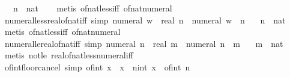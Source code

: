 \begin{isabellebody}
\ \ \ n\ {\isacharcolon}{\kern0pt}{\isacharcolon}{\kern0pt}\ nat\isanewline
%
\isadelimproof
\ \ %
\endisadelimproof
%
\isatagproof
{}\isamarkupfalse%
\ {\isacharparenleft}{\kern0pt}metis\ of{\isacharunderscore}{\kern0pt}nat{\isacharunderscore}{\kern0pt}less{\isacharunderscore}{\kern0pt}iff\ of{\isacharunderscore}{\kern0pt}nat{\isacharunderscore}{\kern0pt}numeral{\isacharparenright}{\kern0pt}%
\endisatagproof
{\isafoldproof}%
%
\isadelimproof
\isanewline
%
\endisadelimproof
\isanewline
{}\isamarkupfalse%
\ numeral{\isacharunderscore}{\kern0pt}less{\isacharunderscore}{\kern0pt}real{\isacharunderscore}{\kern0pt}of{\isacharunderscore}{\kern0pt}nat{\isacharunderscore}{\kern0pt}iff\ {\isacharbrackleft}{\kern0pt}simp{\isacharbrackright}{\kern0pt}{\isacharcolon}{\kern0pt}\ {\isachardoublequoteopen}numeral\ w\ {\isacharless}{\kern0pt}\ real\ n\ {\isasymlongleftrightarrow}\ numeral\ w\ {\isacharless}{\kern0pt}\ n{\isachardoublequoteclose}\isanewline
\ \ \ n\ {\isacharcolon}{\kern0pt}{\isacharcolon}{\kern0pt}\ nat\isanewline
%
\isadelimproof
\ \ %
\endisadelimproof
%
\isatagproof
{}\isamarkupfalse%
\ {\isacharparenleft}{\kern0pt}metis\ of{\isacharunderscore}{\kern0pt}nat{\isacharunderscore}{\kern0pt}less{\isacharunderscore}{\kern0pt}iff\ of{\isacharunderscore}{\kern0pt}nat{\isacharunderscore}{\kern0pt}numeral{\isacharparenright}{\kern0pt}%
\endisatagproof
{\isafoldproof}%
%
\isadelimproof
\isanewline
%
\endisadelimproof
\isanewline
{}\isamarkupfalse%
\ numeral{\isacharunderscore}{\kern0pt}le{\isacharunderscore}{\kern0pt}real{\isacharunderscore}{\kern0pt}of{\isacharunderscore}{\kern0pt}nat{\isacharunderscore}{\kern0pt}iff\ {\isacharbrackleft}{\kern0pt}simp{\isacharbrackright}{\kern0pt}{\isacharcolon}{\kern0pt}\ {\isachardoublequoteopen}numeral\ n\ {\isasymle}\ real\ m\ {\isasymlongleftrightarrow}\ numeral\ n\ {\isasymle}\ m{\isachardoublequoteclose}\isanewline
\ \ \ m\ {\isacharcolon}{\kern0pt}{\isacharcolon}{\kern0pt}\ nat\isanewline
%
\isadelimproof
\ \ %
\endisadelimproof
%
\isatagproof
{}\isamarkupfalse%
\ {\isacharparenleft}{\kern0pt}metis\ not{\isacharunderscore}{\kern0pt}le\ real{\isacharunderscore}{\kern0pt}of{\isacharunderscore}{\kern0pt}nat{\isacharunderscore}{\kern0pt}less{\isacharunderscore}{\kern0pt}numeral{\isacharunderscore}{\kern0pt}iff{\isacharparenright}{\kern0pt}%
\endisatagproof
{\isafoldproof}%
%
\isadelimproof
\isanewline
%
\endisadelimproof
\isanewline
{}\isamarkupfalse%
\ of{\isacharunderscore}{\kern0pt}int{\isacharunderscore}{\kern0pt}floor{\isacharunderscore}{\kern0pt}cancel\ {\isacharbrackleft}{\kern0pt}simp{\isacharbrackright}{\kern0pt}{\isacharcolon}{\kern0pt}\ {\isachardoublequoteopen}of{\isacharunderscore}{\kern0pt}int\ {\isasymlfloor}x{\isasymrfloor}\ {\isacharequal}{\kern0pt}\ x\ {\isasymlongleftrightarrow}\ {\isacharparenleft}{\kern0pt}{\isasymexists}n{\isacharcolon}{\kern0pt}{\isacharcolon}{\kern0pt}int{\isachardot}{\kern0pt}\ x\ {\isacharequal}{\kern0pt}\ of{\isacharunderscore}{\kern0pt}int\ n{\isacharparenright}{\kern0pt}{\isachardoublequoteclose}\isanewline

\end{isabellebody}

